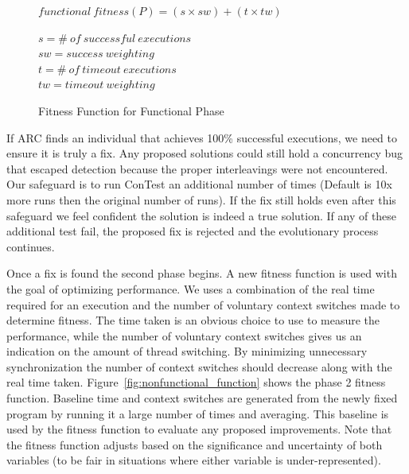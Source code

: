 \documentclass[10pt, conference, compsocconf]{IEEEtran}
\begin{document}
\begin{figure}
\begin{footnotesize}
\begin{center}
$functional\ fitness(P) = (s \times sw) + (t \times tw)$
\end{center}
\end{footnotesize}
\begin{tiny}
\begin{center}
$s = \#\ of\ successful\ executions$ \\
$sw = success\ weighting$ \\
$t = \#\ of\ timeout\ executions$ \\
$tw = timeout\ weighting$
\end{center}
\end{tiny}
\caption{Fitness Function for Functional Phase}
\label{fig:functional_fitness}
\end{figure}

If ARC finds an individual that achieves 100\% successful executions, we need
to ensure it is truly a fix. Any proposed solutions could still hold a
concurrency bug that escaped detection because the proper interleavings were
not encountered. Our safeguard is to run ConTest an additional number of times
(Default is 10x more runs then the original number of runs). If the fix still
holds even after this safeguard we feel confident the solution is indeed a true
solution. If any of these additional test fail, the proposed fix is rejected 
and the evolutionary process continues.

Once a fix is found the second phase begins.  A new fitness function is used 
with the goal of optimizing performance.  We uses a combination of the real time
required for an execution and the number of voluntary context switches made to
determine fitness.
The time taken is an obvious choice to use to measure the performance, while
the number of voluntary context switches gives us an indication on the amount
of thread switching. By minimizing unnecessary synchronization the number of
context switches should decrease along with the real time taken.
Figure~\ref{fig:nonfunctional_function} shows the phase 2 fitness function. 
Baseline time and context switches are generated from the newly fixed program by
running it a large number of times and averaging. This baseline is used by the
fitness function to evaluate any proposed improvements. Note that the fitness
function adjusts based on the significance and uncertainty of both 
variables (to be fair in situations where either variable is under-represented).
\end{document}
